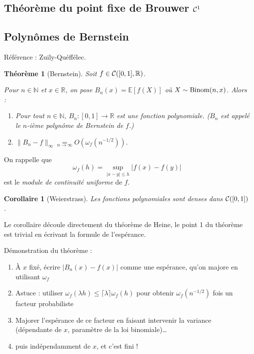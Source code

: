 \documentclass[a4paper, 11pt]{article}
\def\N{\mathbb{N}}
\def\R{\mathbb{R}}
\def\Cf{{\cal{C}}}
\def\E{\mathbb{E}}
\newtheorem*{theorem}{Théorème}
\newtheorem*{corollary}{Corollaire}
\begin{document}
\subsection{Théorème du point fixe de Brouwer $\Cf^1$}

\newpage

\subsection{Polynômes de Bernstein}

Référence : Zuily-Quéffélec.

\begin{theorem}[Bernstein]
  Soit $f \in \Cf([0,1], \R)$.
  
  Pour $n \in \N$ et $x \in \R$, on pose $B_n(x) = \E[f(X)]$ où $X \sim
  \textnormal{Binom}(n,x)$. Alors :
  \begin{enumerate}
  \item Pour tout $n \in \N$, $B_n : [0,1] \to \R$ est une fonction polynomiale.
    ($B_n$ est appelé le $n$-ième polynôme de Bernstein de $f$.)
  \item $\|B_n - f\|_\infty \underset{n \to \infty}{=} O\left(
      \omega_f(n^{-1/2}) \right)$.
  \end{enumerate}
\end{theorem}

On rappelle que
\[ \omega_f(h) = \sup_{|x-y| \leq h} |f(x) - f(y)| \]
est le \emph{module de continuité uniforme} de $f$.

\begin{corollary}[Weierstrass]
  Les fonctions polynomiales sont denses dans $\Cf([0,1])$.
\end{corollary}

Le corollaire découle directement du théorème de Heine, le point 1 du théorème
est trivial en écrivant la formule de l'espérance.

Démonstration du théorème :
\begin{enumerate}
\item À $x$ fixé, écrire $|B_n(x) - f(x)|$ comme une espérance, qu'on majore en
  utilisant $\omega_f$
\item Astuce : utiliser $\omega_f(\lambda h) \leq \lceil \lambda \rceil
  \omega_f(h)$ pour obtenir $\omega_f(n^{-1/2})$ fois un facteur probabiliste
\item Majorer l'espérance de ce facteur en faisant intervenir la variance
  (dépendante de $x$, paramètre de la loi binomiale)…
\item puis indépendamment de $x$, et c'est fini !
\end{enumerate}
\end{document}
